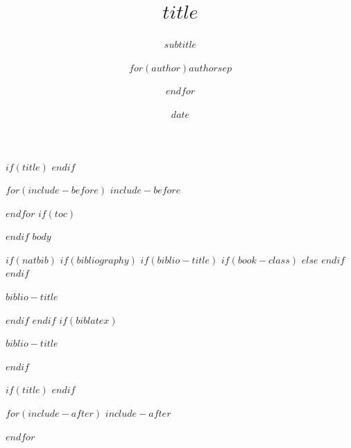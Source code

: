 \documentclass[$if(fontsize)$$fontsize$,$endif$$if(lang)$$babel-lang$,$endif$$if(handout)$handout,$endif$$if(beamer)$ignorenonframetext,$endif$$for(classoption)$$classoption$$sep$,$endfor$]{$documentclass$}
\title{$title$}
\subtitle{$subtitle$}
\author{$for(author)$$author$$sep$ \and $endfor$}
\institute{$institute$}
\date{$date$}
\newif\ifbibliography
\begin{document}
$if(title)$
\frame{\titlepage}
$endif$

$for(include-before)$
$include-before$

$endfor$
$if(toc)$
\begin{frame}
\tableofcontents[hideallsubsections]
\end{frame}

$endif$
$body$

$if(natbib)$
$if(bibliography)$
$if(biblio-title)$
$if(book-class)$
\renewcommand\bibname{$biblio-title$}
$else$
\renewcommand\refname{$biblio-title$}
$endif$
$endif$
\begin{frame}[allowframebreaks]{$biblio-title$}
\bibliographytrue

\end{frame}

$endif$
$endif$
$if(biblatex)$
\begin{frame}[allowframebreaks]{$biblio-title$}
\bibliographytrue
\printbibliography[heading=none]
\end{frame}

$endif$

$if(title)$
\frame{\titlepage}
$endif$

$for(include-after)$
$include-after$

$endfor$
\end{document}
